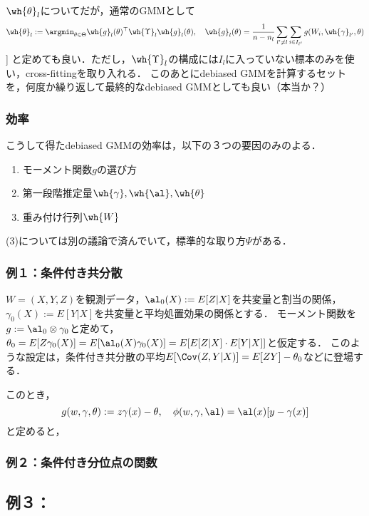 \documentclass[uplatex,dvipdfmx]{jsreport}
\begin{document}
\begin{remark}
    $\wh{\theta}_l$についてだが，通常のGMMとして
    \[\wh{\theta}_l:=\argmin_{\theta\in\Theta}\wh{g}_l(\theta)^\top\wh{\Upsilon}_l\wh{g}_l(\theta),\quad\wh{g}_l(\theta)=\frac{1}{n-n_l}\sum_{l'\ne l}\sum_{i\in I_{l'}}g(W_i,\wh{\gamma}_{l'},\theta)\]]
    と定めても良い．ただし，$\wh{\Upsilon}_l$の構成には$I_l$に入っていない標本のみを使い，cross-fittingを取り入れる．
    このあとにdebiased GMMを計算するセットを，何度か繰り返して最終的なdebiased GMMとしても良い（本当か？）
\end{remark}

\subsubsection{効率}

こうして得たdebiased GMMの効率は，以下の３つの要因のみのよる．
\begin{enumerate}
    \item モーメント関数$g$の選び方
    \item 第一段階推定量$\wh{\gamma},\wh{\al},\wh{\theta}$
    \item 重み付け行列$\wh{W}$
\end{enumerate}
(3)については別の議論で済んでいて，標準的な取り方$\Psi$がある．

\subsubsection{例１：条件付き共分散}

\begin{example}
    $W=(X,Y,Z)$を観測データ，$\al_0(X):=E[Z|X]$を共変量と割当の関係，$\gamma_0(X):=E[Y|X]$を共変量と平均処置効果の関係とする．
    モーメント関数を$g:=\al_0\otimes\gamma_0$と定めて，$\theta_0=E[Z\gamma_0(X)]=E[\al_0(X)\gamma_0(X)]=E[E[Z|X]\cdot E[Y|X]]$と仮定する．
    このような設定は，条件付き共分散の平均$E[\Cov(Z,Y|X)]=E[ZY]-\theta_0$などに登場する．

    このとき，
    \[g(w,\gamma,\theta):=z\gamma(x)-\theta,\quad\phi(w,\gamma,\al)=\al(x)[y-\gamma(x)]\]
    と定めると，
\end{example}

\subsubsection{例２：条件付き分位点の関数}

\subsection{例３：}
\end{document}
